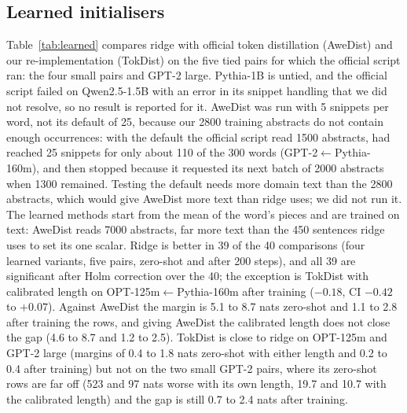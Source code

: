 \documentclass[preprint,12pt]{elsarticle}
\begin{document}
\subsection{Learned initialisers}
\label{sec:learned}
Table~\ref{tab:learned} compares ridge with official token distillation (AweDist) and our re-implementation (TokDist) on the five tied pairs for which the official script ran: the four small pairs and GPT-2 large. Pythia-1B is untied, and the official script failed on Qwen2.5-1.5B with an error in its snippet handling that we did not resolve, so no result is reported for it. AweDist was run with 5 snippets per word, not its default of 25, because our 2800 training abstracts do not contain enough occurrences: with the default the official script read 1500 abstracts, had reached 25 snippets for only about 110 of the 300 words (GPT-2$\leftarrow$Pythia-160m), and then stopped because it requested its next batch of 2000 abstracts when 1300 remained. Testing the default needs more domain text than the 2800 abstracts, which would give AweDist more text than ridge uses; we did not run it. The learned methods start from the mean of the word's pieces and are trained on text: AweDist reads 7000 abstracts, far more text than the 450 sentences ridge uses to set its one scalar. Ridge is better in 39 of the 40 comparisons (four learned variants, five pairs, zero-shot and after 200 steps), and all 39 are significant after Holm correction over the 40; the exception is TokDist with calibrated length on OPT-125m$\leftarrow$Pythia-160m after training ($-0.18$, CI $-0.42$ to $+0.07$). Against AweDist the margin is 5.1 to 8.7 nats zero-shot and 1.1 to 2.8 after training the rows, and giving AweDist the calibrated length does not close the gap (4.6 to 8.7 and 1.2 to 2.5). TokDist is close to ridge on OPT-125m and GPT-2 large (margins of 0.4 to 1.8 nats zero-shot with either length and 0.2 to 0.4 after training) but not on the two small GPT-2 pairs, where its zero-shot rows are far off (523 and 97 nats worse with its own length, 19.7 and 10.7 with the calibrated length) and the gap is still 0.7 to 2.4 nats after training.
\begin{table}[t]
\centering\small
\caption{Ridge minus learned initialisers, mean sentence NLL difference in nats (negative = ridge better), PubMed seed 1. AweDist is the official code, TokDist our re-implementation, cal.\ = calibrated length. $^{*}$ the 95\,\% abstract-level bootstrap interval excludes 0; $^{\dagger}$ still significant after Holm correction over all 40 comparisons.}
\label{tab:learned}
\resizebox{\textwidth}{!}{}
\end{table}
\end{document}
